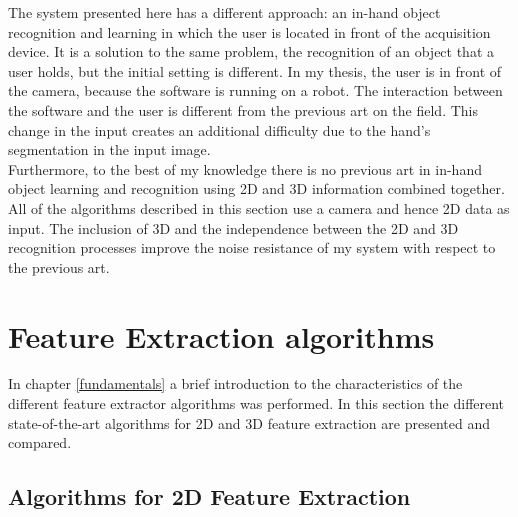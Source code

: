 The system presented here has a different approach: an in-hand object recognition and learning in which the user is located in front of the acquisition device. 
It is a solution to the same problem, the recognition of an object that a user holds, but the initial setting is different. 
In my thesis, the user is in front of the camera, because the software is running on a robot. 
The interaction between the software and the user is different from the previous art on the field. 
This change in the input creates an additional difficulty due to the hand's segmentation in the input image. 
\\

Furthermore, to the best of my knowledge there is no previous art in in-hand object learning and recognition using 2D and 3D information combined together. 
All of the algorithms described in this section use a camera and hence 2D data as input. 
The inclusion of 3D and the independence between the 2D and 3D recognition processes improve the noise resistance of my system with respect to the previous art. 










\section{Feature Extraction algorithms}
In chapter \ref{fundamentals} a brief introduction to the characteristics of the different feature extractor algorithms was performed. 
In this section the different state-of-the-art algorithms for 2D and 3D feature extraction are presented and compared. 

\subsection{Algorithms for 2D Feature Extraction}
\label{2d_features}


